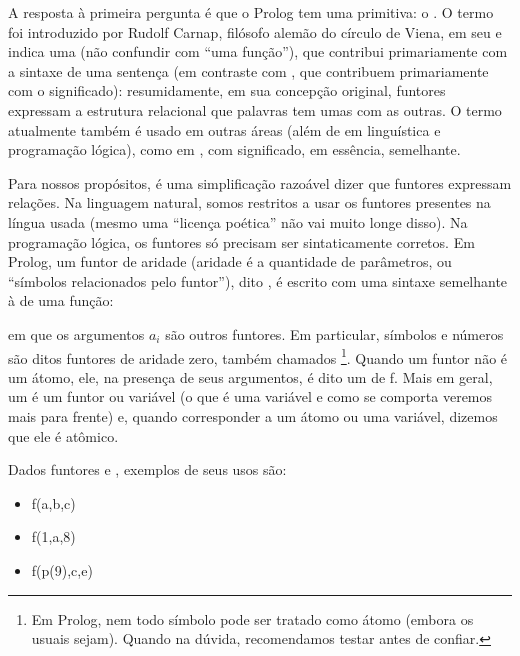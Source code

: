 A resposta à primeira pergunta é que o Prolog tem uma primitiva: o
. O termo  foi introduzido por
Rudolf Carnap, filósofo alemão do círculo de Viena, em seu
\cite{carnap} e indica uma
 (não confundir com ``uma função''), que
contribui primariamente com a sintaxe de uma sentença (em contraste
com , que contribuem primariamente com o
significado): resumidamente, em sua concepção original, funtores
expressam a estrutura relacional que palavras tem umas com as
outras. O termo atualmente também é usado em outras áreas (além de em
linguística e programação lógica), como em , com significado, em essência, semelhante.

Para nossos propósitos, é uma simplificação razoável dizer que
funtores expressam relações. Na linguagem natural, somos restritos a
usar os funtores presentes na língua usada (mesmo uma ``licença
poética'' não vai muito longe disso).  Na programação lógica, os
funtores só precisam ser sintaticamente corretos. Em Prolog, um funtor
 de aridade  (aridade é a quantidade de
parâmetros, ou ``símbolos relacionados pelo funtor''), dito
, é escrito com uma sintaxe semelhante à de uma função:


\noindent em que os argumentos $a_i$ são outros funtores. Em
particular, símbolos e números são ditos funtores de aridade zero,
também chamados \footnote{Em Prolog, nem todo
símbolo pode ser tratado como átomo (embora os usuais sejam). Quando
na dúvida, recomendamos testar antes de confiar.}. Quando um funtor
 não é um átomo, ele, na presença de seus argumentos, é
dito um  de 
f. Mais em geral, um  é um funtor ou variável (o que
é uma variável e como se comporta veremos mais para frente) e, quando
corresponder a um átomo ou uma variável, dizemos que ele é atômico.

Dados funtores  e , exemplos de seus usos são:

\begin{itemize}
  \item f(a,b,c)
  \item f(1,a,8)
  \item f(p(9),c,e)
\end{itemize}

